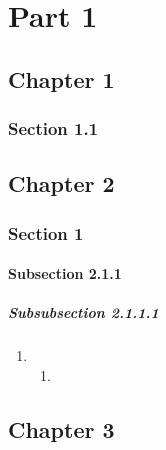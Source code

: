 \documentclass{book}
\begin{document}
\part{Part 1}
\label{part:part-1}

\setcounter{chapter}{12}

\chapter{Chapter 1}
\label{cha:chapter-1}


\section{Section 1.1}
\label{sec:section-1-1}
\mainmatter


\chapter{Chapter 2}
\label{cha:chapter-2}

\clearpage{}

\section{Section 1}
\label{sec:section-2-1}

\subsection{Subsection 2.1.1}
\label{sec:subsection-2.1.1}

\subsubsection{Subsubsection 2.1.1.1}
\label{sec:subs-2.1.1.1}


\begin{enumerate}
\item {}
  \begin{enumerate}
  \item {}
  \end{enumerate}
\end{enumerate}

\chapter{Chapter 3}
\label{cha:chapter-3}
\end{document}
